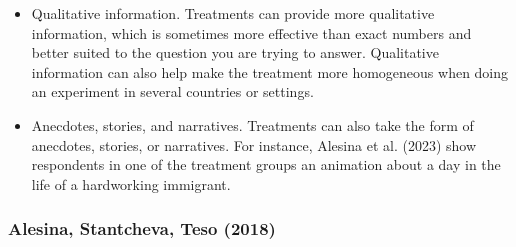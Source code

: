 \documentclass[a4paper, 12pt]{article}
\begin{document}
\begin{itemize}
\begin{itemize}
        \item Qualitative information. Treatments can provide more qualitative information, which is sometimes more effective than exact numbers and better suited to the question you are trying to answer. Qualitative information can also help make the treatment more homogeneous when doing an experiment in several countries or settings.
        \item Anecdotes, stories, and narratives. Treatments can also take the form of anecdotes, stories, or narratives. For instance, Alesina et al. (2023) show respondents in one of the treatment groups an animation about a day in the life of a hardworking immigrant.
    \end{itemize}
\end{itemize}
\subsubsection*{Alesina, Stantcheva, Teso (2018)}
\end{document}
